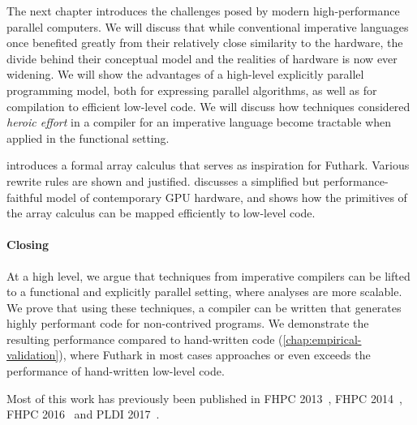 The next chapter introduces the challenges posed by modern
high-performance parallel computers.  We will discuss that while
conventional imperative languages once benefited greatly from their
relatively close similarity to the hardware, the divide behind their
conceptual model and the realities of hardware is now ever widening.
We will show the advantages of a high-level explicitly parallel
programming model, both for expressing parallel algorithms, as well as
for compilation to efficient low-level code.  We will discuss how
techniques considered \textit{heroic effort} in a compiler for an
imperative language become tractable when applied in the functional
setting.

 introduces a formal array calculus that serves as
inspiration for Futhark.  Various rewrite rules are shown and
justified.   discusses a simplified but
performance-faithful model of contemporary GPU hardware, and shows how
the primitives of the array calculus can be mapped efficiently to
low-level code.

\paragraph{Closing}

At a high level, we argue that techniques from imperative compilers
can be lifted to a functional and explicitly parallel setting, where
analyses are more scalable.  We prove that using these techniques, a
compiler can be written that generates highly performant code for
non-contrived programs.  We demonstrate the resulting performance
compared to hand-written code (\cref{chap:empirical-validation}),
where Futhark in most cases approaches or even exceeds the performance
of hand-written low-level code.

Most of this work has previously been published in FHPC
2013~\cite{henriksen2013t2}, FHPC 2014~\cite{henriksen2014size}, FHPC
2016~\cite{Futhark:redomap,} and PLDI
2017~\cite{henriksen2017futhark}.

